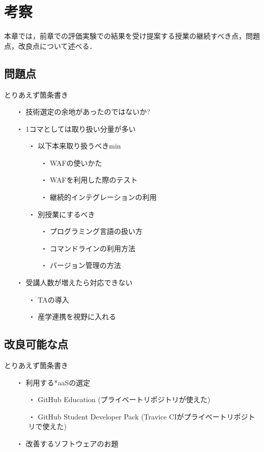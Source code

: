 \chapter{考察}

本章では，前章での評価実験での結果を受け提案する授業の継続すべき点，問題点，改良点について述べる．

\section{問題点}

とりあえず箇条書き

\begin{itemize}
  \item[・] 技術選定の余地があったのではないか?
  \item[・] 1コマとしては取り扱い分量が多い
    \begin{itemize}
    \item[・] 以下本来取り扱うべきmin
      \begin{itemize}
        \item[・] WAFの使いかた
        \item[・] WAFを利用した際のテスト
        \item[・] 継続的インテグレーションの利用
      \end{itemize}
    \item[・] 別授業にするべき
      \begin{itemize}
        \item[・] プログラミング言語の扱い方
        \item[・] コマンドラインの利用方法
        \item[・] バージョン管理の方法
      \end{itemize}
    \end{itemize}
  \item[・] 受講人数が増えたら対応できない
    \begin{itemize}
      \item[・] TAの導入
      \item[・] 産学連携を視野に入れる
    \end{itemize}
\end{itemize}

\section{改良可能な点}

とりあえず箇条書き

\begin{itemize}
\item[・] 利用する*aaSの選定
  \begin{itemize}
    \item[・] GitHub Education (プライベートリポジトリが使えた)
    \item[・] GitHub Student Developer Pack (Travice CIがプライベートリポジトリで使えた)
  \end{itemize}
\item[・] 改善するソフトウェアのお題
\end{itemize}
